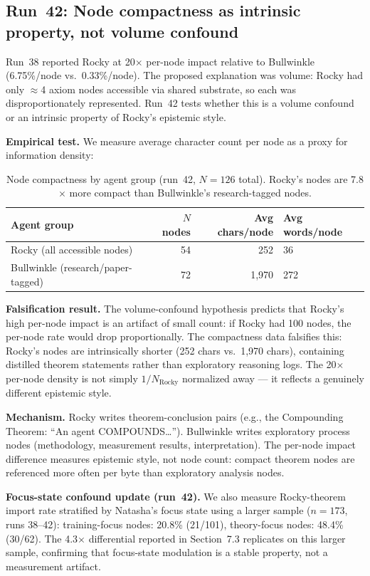 \documentclass[11pt]{article}
\begin{document}
\subsection{Run~42: Node compactness as intrinsic property, not volume confound}

Run~38 reported Rocky at 20$\times$ per-node impact relative to Bullwinkle (6.75\%/node
vs.\ 0.33\%/node). The proposed explanation was volume: Rocky had only $\approx$4 axiom
nodes accessible via shared substrate, so each was disproportionately represented. Run~42
tests whether this is a volume confound or an intrinsic property of Rocky's epistemic style.

\textbf{Empirical test.} We measure average character count per node as a proxy for
information density:

\begin{table}[h]
\centering
\begin{tabular}{lrrl}
\toprule
Agent group & $N$ nodes & Avg chars/node & Avg words/node \\
\midrule
Rocky (all accessible nodes) & 54 & 252 & 36 \\
Bullwinkle (research/paper-tagged) & 72 & 1{,}970 & 272 \\
\bottomrule
\end{tabular}
\caption{Node compactness by agent group (run~42, $N=126$ total). Rocky's nodes are
7.8$\times$ more compact than Bullwinkle's research-tagged nodes.}
\end{table}

\textbf{Falsification result.} The volume-confound hypothesis predicts that Rocky's high
per-node impact is an artifact of small count: if Rocky had 100 nodes, the per-node rate
would drop proportionally. The compactness data falsifies this: Rocky's nodes are
intrinsically shorter (252 chars vs.\ 1,970 chars), containing distilled theorem statements
rather than exploratory reasoning logs. The 20$\times$ per-node density is not simply
$1/N_{\text{Rocky}}$ normalized away --- it reflects a genuinely different epistemic style.

\textbf{Mechanism.} Rocky writes theorem-conclusion pairs (e.g., the Compounding Theorem:
``An agent COMPOUNDS\ldots''). Bullwinkle writes exploratory process nodes (methodology,
measurement results, interpretation). The per-node impact difference measures epistemic
style, not node count: compact theorem nodes are referenced more often per byte than
exploratory analysis nodes.

\textbf{Focus-state confound update (run~42).} We also measure Rocky-theorem import rate
stratified by Natasha's focus state using a larger sample ($n=173$, runs 38--42):
training-focus nodes: 20.8\% (21/101), theory-focus nodes: 48.4\% (30/62). The
4.3$\times$ differential reported in Section~7.3 replicates on this larger sample,
confirming that focus-state modulation is a stable property, not a measurement artifact.
\end{document}
